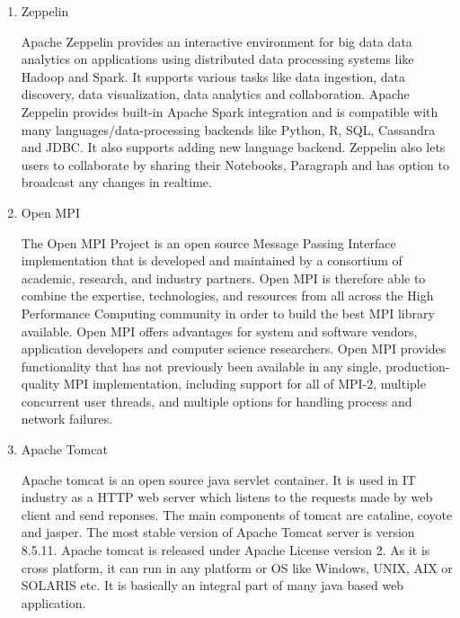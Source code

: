 \begin{enumerate}
\item {} 
Zeppelin

Apache Zeppelin \label{\detokenize{i524/technologies:id694}}{\hyperref[\detokenize{i524/technologies:www-zeppelinwebsite}]{\sphinxcrossref{{[}605{]}}}} provides an
interactive environment for big data data analytics on
applications using distributed data processing systems like
Hadoop and Spark. It supports various tasks like data ingestion,
data discovery, data visualization, data analytics and
collaboration. Apache Zeppelin provides built-in Apache Spark
integration and is compatible with many languages/data-processing
backends like Python, R, SQL, Cassandra and JDBC. It also
supports adding new language backend. Zeppelin also lets users to
collaborate by sharing their Notebooks, Paragraph and has option
to broadcast any changes in realtime.

\item {} 
Open MPI

The Open MPI Project \label{\detokenize{i524/technologies:id695}}{\hyperref[\detokenize{i524/technologies:www-open-mpi}]{\sphinxcrossref{{[}606{]}}}} is an open
source Message Passing Interface implementation that is developed
and maintained by a consortium of academic, research, and
industry partners. Open MPI is therefore able to combine the
expertise, technologies, and resources from all across the High
Performance Computing community in order to build the best MPI
library available. Open MPI offers advantages for system and
software vendors, application developers and computer science
researchers. Open MPI \label{\detokenize{i524/technologies:id696}}{\hyperref[\detokenize{i524/technologies:open-mpi-paper-2004}]{\sphinxcrossref{{[}607{]}}}} provides
functionality that has not previously been available in any
single, production-quality MPI implementation, including support
for all of MPI-2, multiple concurrent user threads, and multiple
options for handling process and network failures.

\item {} 
Apache Tomcat

Apache tomcat is an open source java servlet
container. \label{\detokenize{i524/technologies:id697}}{\hyperref[\detokenize{i524/technologies:www-tomcat-official}]{\sphinxcrossref{{[}608{]}}}} It is used in IT industry
as a HTTP web server which listens to the requests made by web
client and send reponses. The main components of tomcat are
cataline, coyote and jasper. The most stable version of Apache
Tomcat server is version 8.5.11. Apache tomcat is released under
Apache License version 2. \label{\detokenize{i524/technologies:id698}}{\hyperref[\detokenize{i524/technologies:www-tomcat-wiki}]{\sphinxcrossref{{[}609{]}}}} As it is cross
platform, it can run in any platform or OS like Windows, UNIX,
AIX or SOLARIS etc. It is basically an integral part of many java
based web application.


\end{enumerate}
